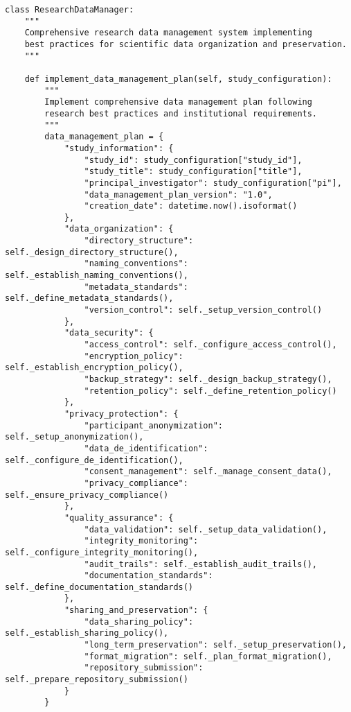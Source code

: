 \documentclass[12pt,a4paper]{article}
\begin{document}
\begin{verbatim}
class ResearchDataManager:
    """
    Comprehensive research data management system implementing
    best practices for scientific data organization and preservation.
    """
    
    def implement_data_management_plan(self, study_configuration):
        """
        Implement comprehensive data management plan following
        research best practices and institutional requirements.
        """
        data_management_plan = {
            "study_information": {
                "study_id": study_configuration["study_id"],
                "study_title": study_configuration["title"],
                "principal_investigator": study_configuration["pi"],
                "data_management_plan_version": "1.0",
                "creation_date": datetime.now().isoformat()
            },
            "data_organization": {
                "directory_structure": self._design_directory_structure(),
                "naming_conventions": self._establish_naming_conventions(),
                "metadata_standards": self._define_metadata_standards(),
                "version_control": self._setup_version_control()
            },
            "data_security": {
                "access_control": self._configure_access_control(),
                "encryption_policy": self._establish_encryption_policy(),
                "backup_strategy": self._design_backup_strategy(),
                "retention_policy": self._define_retention_policy()
            },
            "privacy_protection": {
                "participant_anonymization": self._setup_anonymization(),
                "data_de_identification": self._configure_de_identification(),
                "consent_management": self._manage_consent_data(),
                "privacy_compliance": self._ensure_privacy_compliance()
            },
            "quality_assurance": {
                "data_validation": self._setup_data_validation(),
                "integrity_monitoring": self._configure_integrity_monitoring(),
                "audit_trails": self._establish_audit_trails(),
                "documentation_standards": self._define_documentation_standards()
            },
            "sharing_and_preservation": {
                "data_sharing_policy": self._establish_sharing_policy(),
                "long_term_preservation": self._setup_preservation(),
                "format_migration": self._plan_format_migration(),
                "repository_submission": self._prepare_repository_submission()
            }
        }
        

\end{verbatim}
\end{document}
